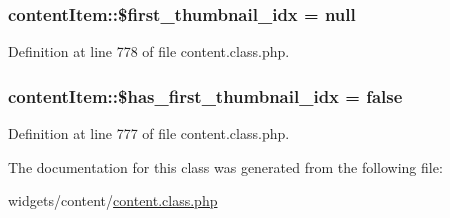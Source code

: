 \subsubsection[{\$first\+\_\+thumbnail\+\_\+idx}]{\setlength{\rightskip}{0pt plus 5cm}content\+Item\+::\$first\+\_\+thumbnail\+\_\+idx = null}\label{classcontentItem_a3ed95afadefbe20bd085e1d88220f4b1}


Definition at line 778 of file content.\+class.\+php.

\hypertarget{classcontentItem_a78da7867160d34bf7e422524f6a78c37}{}
\subsubsection[{\$has\+\_\+first\+\_\+thumbnail\+\_\+idx}]{\setlength{\rightskip}{0pt plus 5cm}content\+Item\+::\$has\+\_\+first\+\_\+thumbnail\+\_\+idx = false}\label{classcontentItem_a78da7867160d34bf7e422524f6a78c37}


Definition at line 777 of file content.\+class.\+php.



The documentation for this class was generated from the following file\+:\begin{DoxyCompactItemize}
\item 
widgets/content/\hyperlink{content_8class_8php}{content.\+class.\+php}\end{DoxyCompactItemize}
